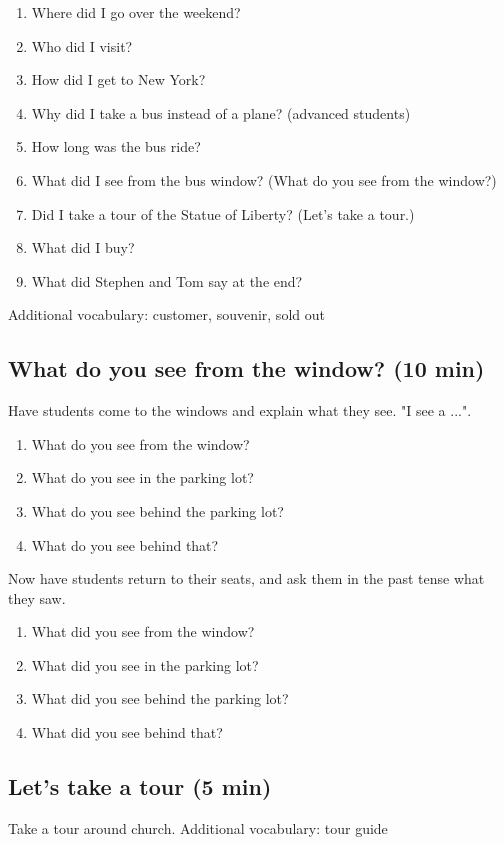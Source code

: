 \documentclass{tufte-handout}
\begin{document}
\begin{enumerate}
\item Where did I go over the weekend?
\item Who did I visit?
\item How did I get to New York?
\item Why did I take a bus instead of a plane? (advanced students)
\item How long was the bus ride?
\item What did I see from the bus window? (What do you see from the window?)
\item Did I take a tour of the Statue of Liberty? (Let's take a tour.)
\item What did I buy?
\item What did Stephen and Tom say at the end?
\end{enumerate}

\noindent Additional vocabulary: customer, souvenir, sold out

\subsection{What do you see from the window? (10 min)}
Have students come to the windows and explain what they see. "I see a ...".

\begin{enumerate}
\item What do you see from the window?
\item What do you see in the parking lot?
\item What do you see behind the parking lot?
\item What do you see behind that?
\end{enumerate}

Now have students return to their seats, and ask them in the past tense what they saw.

\begin{enumerate}
\item What did you see from the window?
\item What did you see in the parking lot?
\item What did you see behind the parking lot?
\item What did you see behind that?
\end{enumerate}

\subsection{Let's take a tour (5 min)}
Take a tour around church.
Additional vocabulary: tour guide
\end{document}
